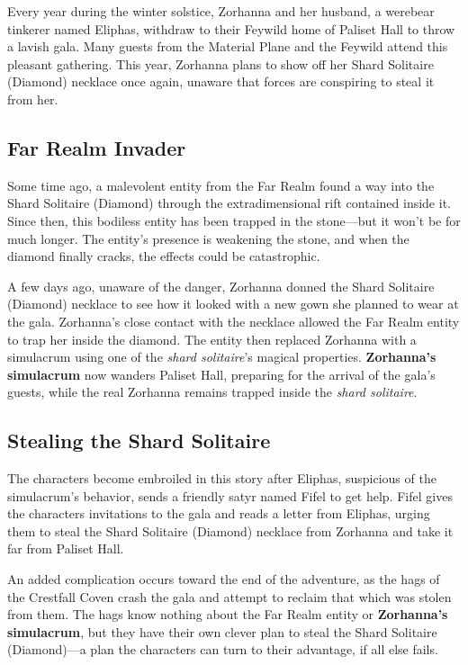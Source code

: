 \documentclass[10pt,a4paper,twoside,bg=print,twocolumn,openany,nodeprecatedcode]{dndbook}
\begin{document}
Every year during the winter solstice, Zorhanna and her husband, a werebear tinkerer named Eliphas, withdraw to their Feywild home of Paliset Hall to throw a lavish gala. Many guests from the Material Plane and the Feywild attend this pleasant gathering. This year, Zorhanna plans to show off her Shard Solitaire (Diamond) necklace once again, unaware that forces are conspiring to steal it from her.

\subsection{Far Realm Invader}
Some time ago, a malevolent entity from the Far Realm found a way into the Shard Solitaire (Diamond) through the extradimensional rift contained inside it. Since then, this bodiless entity has been trapped in the stone—but it won't be for much longer. The entity's presence is weakening the stone, and when the diamond finally cracks, the effects could be catastrophic.

A few days ago, unaware of the danger, Zorhanna donned the Shard Solitaire (Diamond) necklace to see how it looked with a new gown she planned to wear at the gala. Zorhanna's close contact with the necklace allowed the Far Realm entity to trap her inside the diamond. The entity then replaced Zorhanna with a simulacrum using one of the \textit{shard solitaire}'s magical properties. \textbf{Zorhanna's simulacrum} now wanders Paliset Hall, preparing for the arrival of the gala's guests, while the real Zorhanna remains trapped inside the \textit{shard solitaire}.

\subsection{Stealing the Shard Solitaire}
The characters become embroiled in this story after Eliphas, suspicious of the simulacrum's behavior, sends a friendly satyr named Fifel to get help. Fifel gives the characters invitations to the gala and reads a letter from Eliphas, urging them to steal the Shard Solitaire (Diamond) necklace from Zorhanna and take it far from Paliset Hall.

An added complication occurs toward the end of the adventure, as the hags of the Crestfall Coven crash the gala and attempt to reclaim that which was stolen from them. The hags know nothing about the Far Realm entity or \textbf{Zorhanna's simulacrum}, but they have their own clever plan to steal the Shard Solitaire (Diamond)—a plan the characters can turn to their advantage, if all else fails.
\end{document}
